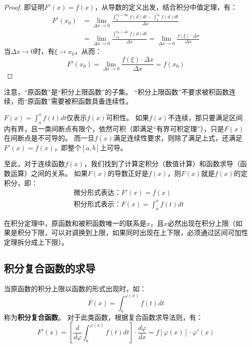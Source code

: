 \begin{proof}
即证明$F'\left( x \right) =f\left( x \right) $，从导数的定义出发，结合积分中值定理，有：
\begin{align*}
F'\left( x_0 \right) &=\underset{\Delta x\rightarrow 0}{\lim}\frac{\int_a^{x_0+\Delta x}{f\left( d \right) dt}-\int_a^{x_0}{f\left( d \right) dt}}{\Delta x} \\
&=\underset{\Delta x\rightarrow 0}{\lim}\frac{\int_{x_0}^{x_0+\Delta x}{f\left( d \right) dt}}{\Delta x}=\underset{\Delta x\rightarrow 0}{\lim}\frac{f\left( \xi \right) \cdot \Delta x}{\Delta x}
\end{align*}
当$\Delta x\rightarrow 0$时，有$\xi \rightarrow x_0$，从而：
\[
F'\left( x_0 \right) =\underset{\Delta x\rightarrow 0}{\lim}\frac{f\left( \xi \right) \cdot \Delta x}{\Delta x}=f\left( x_0 \right)
\]
\end{proof}

注意，“原函数”是“积分上限函数”的子集。
“积分上限函数”不要求被积函数连续，而“原函数”需要被积函数具备连续性。

$F\left( x \right) =\int_a^x{f\left( t \right) dt}$仅表示$f\left( x \right) $可积性。
如果$f\left( x \right) $不连续，那只要满足区间内有界，且一类间断点有限个，依然可积（即满足“有界可积定理”），只是$F\left( x \right) $在间断点是不可导的。
而一旦$f\left( x \right) $满足连续性要求，则除了满足上式，还满足$F'\left( x \right) =f\left( x \right) $，即整个$\left[ a,b \right] $上可导。

至此，对于连续函数$f\left( x \right) $，我们找到了计算定积分（数值计算）和函数求导（函数运算）之间的关系。
如果$F\left( x \right) $的导数正好是$f\left( x \right) $，则$F\left( x \right) $就是$f\left( x \right) $的定积分，即：
\begin{align*}
&\text{微分形式表达：} F'\left( x \right) =f\left( x \right) \\
&\text{积分形式表示：} F\left( x \right) =\int_a^x{f\left( t \right) dt}
\end{align*}

在积分定理中，原函数和被积函数唯一的联系是$x$，且$x$必然出现在积分上限（如果是积分下限，可以对调换到上限，如果同时出现在上下限，必须通过区间可加性定理拆分成上下限）。

\subsection{积分复合函数的求导}

\begin{definition}[积分复合函数]
当原函数的积分上限以函数的形式出现时，如：
\[
F\left( x \right) =\int_a^{\varphi \left( x \right)}{f\left( t \right) dt}
\]
称为{\bf 积分复合函数}。
对于此类函数，根据复合函数求导法则，有：
\[
F'\left( x \right) =\left[ \frac{d}{d\varphi}\int_a^{\varphi \left( x \right)}{f\left( t \right) dt} \right] \cdot \frac{d\varphi}{dx}=f\left[ \varphi \left( x \right) \right] \cdot \varphi '\left( x \right)
\]
\end{definition}

